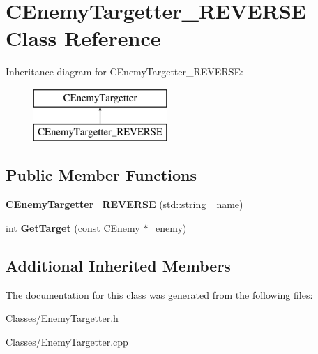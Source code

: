\hypertarget{class_c_enemy_targetter___r_e_v_e_r_s_e}{}\section{C\+Enemy\+Targetter\+\_\+\+R\+E\+V\+E\+R\+SE Class Reference}
\label{class_c_enemy_targetter___r_e_v_e_r_s_e}
Inheritance diagram for C\+Enemy\+Targetter\+\_\+\+R\+E\+V\+E\+R\+SE\+:\begin{figure}[H]
\begin{center}
\leavevmode
\includegraphics[height=2.000000cm]{class_c_enemy_targetter___r_e_v_e_r_s_e}
\end{center}
\end{figure}
\subsection*{Public Member Functions}
\begin{DoxyCompactItemize}
\item 
{\bfseries C\+Enemy\+Targetter\+\_\+\+R\+E\+V\+E\+R\+SE} (std\+::string \+\_\+name)\hypertarget{class_c_enemy_targetter___r_e_v_e_r_s_e_ad0098a6d5d0b7a5f05d2278605ec6134}{}\label{class_c_enemy_targetter___r_e_v_e_r_s_e_ad0098a6d5d0b7a5f05d2278605ec6134}

\item 
int {\bfseries Get\+Target} (const \hyperlink{class_c_enemy}{C\+Enemy} $\ast$\+\_\+enemy)\hypertarget{class_c_enemy_targetter___r_e_v_e_r_s_e_af94f5109663093ba6804382f5c42c057}{}\label{class_c_enemy_targetter___r_e_v_e_r_s_e_af94f5109663093ba6804382f5c42c057}

\end{DoxyCompactItemize}
\subsection*{Additional Inherited Members}


The documentation for this class was generated from the following files\+:\begin{DoxyCompactItemize}
\item 
Classes/Enemy\+Targetter.\+h\item 
Classes/Enemy\+Targetter.\+cpp\end{DoxyCompactItemize}
